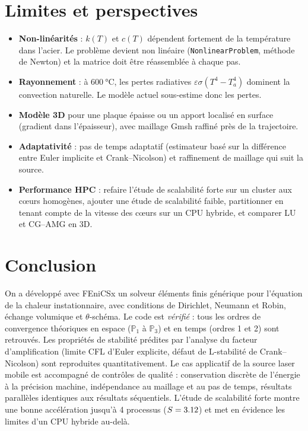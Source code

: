 \documentclass[11pt,a4paper]{article}
\begin{document}
\section{Limites et perspectives}
\begin{itemize}
  \item \textbf{Non-linéarités} : $k(T)$ et $c(T)$ dépendent fortement de la température dans l'acier.
        Le problème devient non linéaire (\texttt{NonlinearProblem}, méthode de Newton) et la matrice
        doit être réassemblée à chaque pas.
  \item \textbf{Rayonnement} : à $\SI{600}{\celsius}$, les pertes radiatives
        $\varepsilon\sigma(T^4-T_a^4)$ dominent la convection naturelle. Le modèle actuel sous-estime
        donc les pertes.
  \item \textbf{Modèle 3D} pour une plaque épaisse ou un apport localisé en surface (gradient dans
        l'épaisseur), avec maillage Gmsh raffiné près de la trajectoire.
  \item \textbf{Adaptativité} : pas de temps adaptatif (estimateur basé sur la différence entre Euler
        implicite et Crank--Nicolson) et raffinement de maillage qui suit la source.
  \item \textbf{Performance HPC} : refaire l'étude de scalabilité forte sur un cluster aux cœurs
        homogènes, ajouter une étude de scalabilité faible, partitionner en tenant compte de la vitesse
        des cœurs sur un CPU hybride, et comparer LU et CG--AMG en 3D.
\end{itemize}

\section{Conclusion}
On a développé avec FEniCSx un solveur éléments finis générique pour l'équation de la chaleur
instationnaire, avec conditions de Dirichlet, Neumann et Robin, échange volumique et $\theta$-schéma. Le
code est \emph{vérifié} : tous les ordres de convergence théoriques en espace ($\mathbb{P}_1$ à
$\mathbb{P}_3$) et en temps (ordres 1 et 2) sont retrouvés. Les propriétés de stabilité prédites par
l'analyse du facteur d'amplification (limite CFL d'Euler explicite, défaut de L-stabilité de
Crank--Nicolson) sont reproduites quantitativement. Le cas applicatif de la source laser mobile est
accompagné de contrôles de qualité : conservation discrète de l'énergie à la précision machine,
indépendance au maillage et au pas de temps, résultats parallèles identiques aux résultats séquentiels.
L'étude de scalabilité forte montre une bonne accélération jusqu'à 4 processus ($S = \num{3.12}$) et
met en évidence les limites d'un CPU hybride au-delà.
\end{document}
